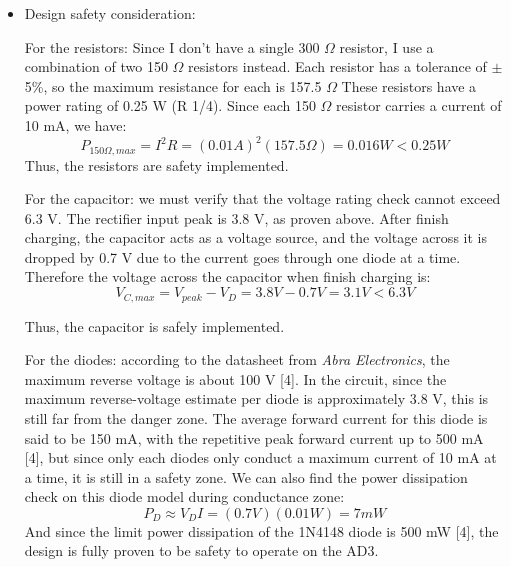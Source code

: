 \documentclass[12pt]{article}
\begin{document}
\begin{itemize}
        Therefore the expected output voltage is \(V_0=3.0V \pm 0.025V\)

        \item Design safety consideration: 


        For the resistors: Since I don't have a single 300 \(\Omega\) resistor, I use a combination of two 150 \(\Omega\) resistors instead. Each resistor has a tolerance of \(\pm\)5\%, so the maximum resistance for each is 157.5 \(\Omega\) These resistors have a power rating of 0.25 W (R 1/4). Since each 150 \(\Omega\) resistor carries a current of 10 mA, we have:
        \begin{equation}
            P_{150\Omega,max}=I^2R=(0.01A)^2(157.5 \Omega)=0.016W <0.25W
        \end{equation}
        Thus, the resistors are safety implemented. 

        For the capacitor: we must verify that the voltage rating check cannot exceed 6.3 V. The rectifier input peak is 3.8 V, as proven above. After finish charging, the capacitor acts as a voltage source, and the voltage across it is dropped by 0.7 V due to the current goes through one diode at a time. Therefore the voltage across the capacitor when finish charging is:
        \begin{equation}
            V_{C,max}=V_{peak}-V_D=3.8V-0.7V=3.1V<6.3V
        \end{equation}

        Thus, the capacitor is safely implemented.  

        For the diodes: according to the datasheet from \textit{Abra Electronics}, the maximum reverse voltage is about 100 V [4]. In the circuit, since the maximum reverse-voltage estimate per diode is approximately 3.8 V, this is still far from the danger zone. The average forward current for this diode is said to be 150 mA, with the repetitive peak forward current up to 500 mA [4], but since only each diodes only conduct a maximum current of 10 mA at a time, it is still in a safety zone. We can also find the power dissipation check on this diode model during conductance zone:
        \begin{equation}
            P_D \approx V_DI=(0.7V)(0.01W)=7mW
        \end{equation}
        And since the limit power dissipation of the 1N4148 diode is 500 mW [4], the design is fully proven to be safety to operate on the AD3.
    \end{itemize} 
\end{document}
